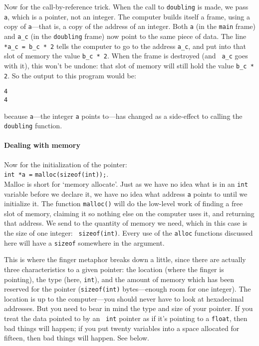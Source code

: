 \documentclass[12pt]{article}
\makeatletter
\def\ttind#1{\index{#1@{\tt #1}}{\tt #1}}
\def\ttindex#1{\index{#1@{\tt #1}}}
\makeatother
\begin{document}
Now for the call-by-reference trick.
When the call to {\tt doubling} is made, we pass {\tt a}, which is a
pointer, not an integer. The computer builds itself a frame, using a copy
of {\tt a}---that is, a copy of the address of an integer. Both {\tt a} (in the {\tt main} frame) 
and {\tt a\_c} (in the {\tt doubling} frame) now point to the same piece of data.
The line {\tt
*a\_c = b\_c * 2} tells the computer to go to the address {\tt a\_c}, and put into that slot of
memory the value {\tt b\_c * 2}. When the frame is destroyed (and {\tt
a\_c} goes with it), this won't be undone: that slot of memory will still
hold the value {\tt b\_c * 2}.  So the output to this program would be:
\begin{verbatim} 
4 
4 
\end{verbatim} 
because {\tt *a}---the integer {\tt a} points to---has changed as a
side-effect to calling the {\tt doubling} function.

\paragraph{Dealing with memory} Now for the initialization of the pointer:\\ 
{\tt int *a =} {\tt malloc(sizeof(int));}.\\
Malloc is short for `memory allocate'. Just as we have no idea what
is in an {\tt int} variable before we declare it, we have no idea what address {\tt a} points to until we
initialize it. The function {\tt malloc()} will do the low-level work of finding a free slot of memory,
claiming it so nothing else on the computer uses it, and returning that address. We send to \ttind{malloc}
the quantity of memory we need, which in this case is the size of one integer: {\tt
sizeof(int)}. Every use of the {\tt *alloc} functions discussed here will have a {\tt sizeof} somewhere in
the argument.\ttindex{sizeof}

This is where the finger metaphor breaks down a little, since there are actually three characteristics
to a given pointer: the location (where the finger is pointing), the type (here, {\tt int}), and the
amount of memory which has been reserved for the pointer ({\tt sizeof(int)} bytes---enough room for one
integer). The location is up to the computer---you should never have
to look at hexadecimal addresses. But you need to bear in mind the type
and size of your pointer. If you treat the data pointed to by an {\tt
int} pointer as if it's pointing to a {\tt float}, then bad things will
happen; if you put twenty variables into a space allocated for fifteen,
then bad things will happen. See below.
\end{document}
